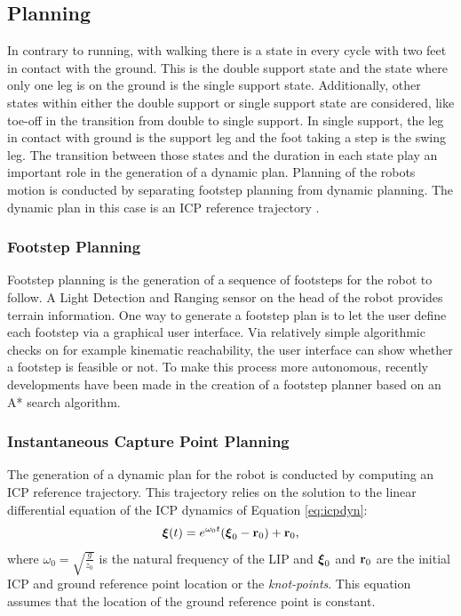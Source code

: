 \subsection{Planning}
In contrary to running, with walking there is a state in every cycle with two feet in contact with the ground. This is the double support state and the state where only one leg is on the ground is the single support state. Additionally, other states within either the double support or single support state are considered, like toe-off in the transition from double to single support. In single support, the leg in contact with ground is the support leg and the foot taking a step is the swing leg. The transition between those states and the duration in each state play an important role in the generation of a dynamic plan. Planning of the robots motion is conducted by separating footstep planning from dynamic planning. The dynamic plan in this case is an \ac{ICP} reference trajectory \cite{seyde2018inclusion}.
\subsubsection{Footstep Planning}
Footstep planning is the generation of a sequence of footsteps for the robot to follow. A Light Detection and Ranging sensor on the head of the robot provides terrain information. One way to generate a footstep plan is to let the user define each footstep via a graphical user interface. Via relatively simple algorithmic checks on for example kinematic reachability, the user interface can show whether a footstep is feasible or not. To make this process more autonomous, recently developments have been made in the creation of a footstep planner based on an A* search algorithm. 
\subsubsection{Instantaneous Capture Point Planning}\label{subsec:icpplan} 
The generation of a dynamic plan for the robot is conducted by computing an \ac{ICP} reference trajectory. This trajectory relies on the solution to the linear differential equation of the \ac{ICP} dynamics of Equation \eqref{eq:icpdyn}:
\begin{equation}\label{eq:icpsol}
	\boldsymbol{\xi}(t)=e^{\omega_0t}(\boldsymbol{\xi}_0- \mathbf{r}_0) + \mathbf{r}_0,
\end{equation}
where $\omega_0=\sqrt{\frac{g}{z_0}}$ is the natural frequency of the \ac{LIP} and $\boldsymbol{\xi}_0$ and $\mathbf{r}_0$ are the initial \ac{ICP} and ground reference point location or the \textit{knot-points}. This equation assumes that the location of the ground reference point is constant. 

